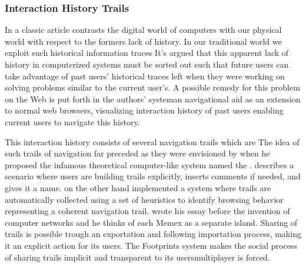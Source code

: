 \subsubsection{Interaction History Trails}
\label{section:background.social.navigation.applied.forms.interaction.history}

In a classic article \citet{wexelblat99} contrasts the digital world of
computers with our physical world with respect to the formers lack of history.
In our traditional world we exploit such historical information traces
It's argued that this apparent lack of history in computerized systems must
be sorted out such that future users can take advantage
of past users' historical traces left when they were working
on solving problems similar to the current user's.
A possible remedy for this problem on the Web is put forth in the authors'
 system\dash{}an navigational aid as an extension to
normal web browsers, visualizing interaction history of past users enabling
current users to navigate this history.

This interaction history consists of several navigation trails which are
The idea of such trails of navigation far preceded \citeauthor{wexelblat99}
as they were envisioned by \citet{bush45} when he proposed the infamous
theoretical computer-like system named the %
.
\citeauthor{bush45} describes a scenario where users are building trails
explicitly, inserts comments if needed, and gives it a name.
\citeauthor{wexelblat99} on the other hand
implemented a system where trails are automatically collected using a set of
heuristics to identify browsing behavior representing a coherent navigation
trail.
\citeauthor{bush45} wrote his essay before the invention of computer networks
and he thinks of each Memex as a separate island. Sharing of trails is
possible trough an exportation and following importation process, making it an
explicit action for its users.
The Footprints system makes the social process of sharing trails implicit and
transparent to its users\dash{}multiplayer is forced.

